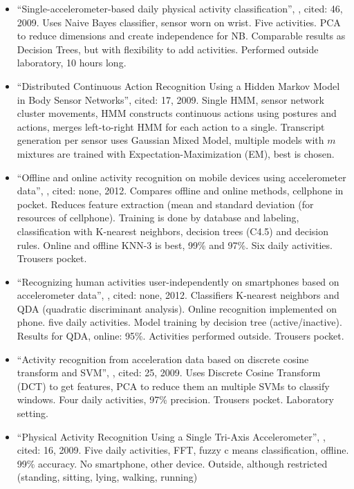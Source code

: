 \begin{itemize}
  \item ``Single-accelerometer-based daily physical activity classification'', \cite{long2009single}, cited: 46, 2009. Uses Naive Bayes classifier, sensor worn on wrist. Five activities. PCA to reduce dimensions and create independence for NB. Comparable results as Decision Trees, but with flexibility to add activities. Performed outside laboratory, 10 hours long.
  \item ``Distributed Continuous Action Recognition Using a Hidden Markov Model in Body Sensor Networks'', \cite{guenterberg2009distributed} cited: 17, 2009. Single HMM, sensor network cluster movements, HMM constructs continuous actions using postures and actions, merges left-to-right HMM for each action to a single. Transcript generation per sensor uses Gaussian Mixed Model, multiple models with $m$ mixtures are trained with Expectation-Maximization (EM), best is chosen.
  \item ``Offline and online activity recognition on mobile devices using accelerometer data'', \cite{duque2012offline}, cited: none, 2012. Compares offline and online methods, cellphone in pocket. Reduces feature extraction (mean and standard deviation (for resources of cellphone). Training is done by database and labeling, classification with K-nearest neighbors, decision trees (C4.5) and decision rules. Online and offline KNN-3 is best, 99\% and 97\%. Six daily activities. Trousers pocket.
  \item ``Recognizing human activities user-independently on smartphones based on accelerometer data'', \cite{siirtola2012recognizing}, cited: none, 2012. Classifiers K-nearest neighbors and QDA (quadratic discriminant analysis). Online recognition implemented on phone. five daily activities. Model training by decision tree (active/inactive). Results for QDA, online: 95\%. Activities performed outside. Trousers pocket.
  \item ``Activity recognition from acceleration data based on discrete cosine transform and SVM'', \cite{he2009activity}, cited: 25, 2009. Uses Discrete Cosine Transform (DCT) to get features, PCA to reduce them an multiple SVMs to classify windows. Four daily activities, 97\% precision. Trousers pocket. Laboratory setting.
  \item ``Physical Activity Recognition Using a Single Tri-Axis Accelerometer'', \cite{lee2178physical}, cited: 16, 2009. Five daily activities, FFT, fuzzy c means classification, offline. 99\% accuracy. No smartphone, other device. Outside, although restricted (standing, sitting, lying, walking, running)
\end{itemize}


